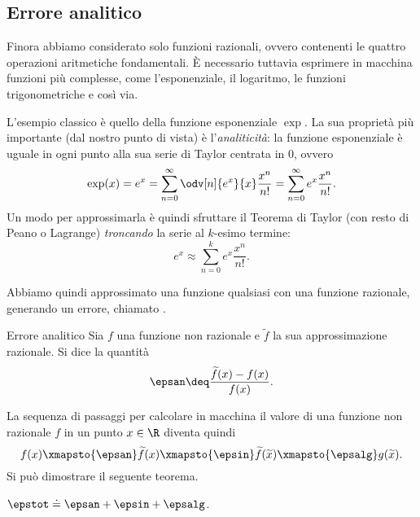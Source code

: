 \subsection{Errore analitico}

Finora abbiamo considerato solo funzioni razionali, ovvero contenenti le quattro operazioni aritmetiche fondamentali. È necessario tuttavia esprimere in macchina funzioni più complesse, come l'esponenziale, il logaritmo, le funzioni trigonometriche e così via.

L'esempio classico è quello della funzione esponenziale $\exp$. La sua proprietà più importante (dal nostro punto di vista) è l'\emph{analiticità}: la funzione esponenziale è uguale in ogni punto alla sua serie di Taylor centrata in $0$, ovvero \[
    \exp(x) = e^x = \sum_{n=0}^\infty \odv[n]{e^x}{x} \frac{x^n}{n!} = \sum_{n=0}^\infty e^x \frac{x^n}{n!}.
\] Un modo per approssimarla è quindi sfruttare il Teorema di Taylor (con resto di Peano o Lagrange) \emph{troncando} la serie al $k$-esimo termine: \[
    e^x \approx \sum_{n=0}^k e^x \frac{x^n}{n!}.
\]

Abbiamo quindi approssimato una funzione qualsiasi con una funzione razionale, generando un errore, chiamato .

\begin{definition}
    {Errore analitico}{}
    Sia $f$ una funzione non razionale e $\tilde{f}$ la sua approssimazione razionale. Si dice  la quantità \[
        \epsan \deq \frac{\tilde{f}(x) - f(x)}{f(x)}.
    \] 
\end{definition}

La sequenza di passaggi per calcolare in macchina il valore di una funzione non razionale $f$ in un punto $x \in \R$ diventa quindi \[
    f(x) \xmapsto{\epsan} \tilde{f}(x) \xmapsto{\epsin} \tilde{f}(\tilde{x}) \xmapsto{\epsalg} g(\tilde x).
\] Si può dimostrare il seguente teorema.

\begin{theorem}{}{}
    $\epstot \doteq \epsan + \epsin + \epsalg$.
\end{theorem}